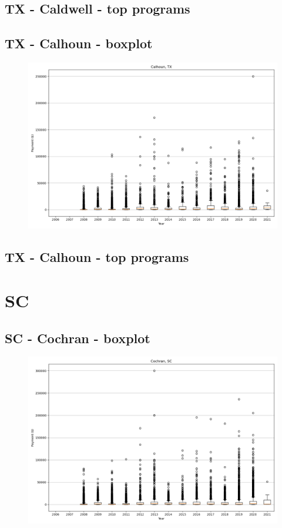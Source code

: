 \subsection*{TX - Caldwell - top programs}

\newpage
\subsection*{TX - Calhoun - boxplot}
\begin{figure}[h]
\centering
\includegraphics[width=7in]{../output/boxplots/counties/Calhoun-TX_boxplot.png}
\end{figure}


\subsection*{TX - Calhoun - top programs}

\newpage
\section*{SC}
\subsection*{SC - Cochran - boxplot}
\begin{figure}[h]
\centering
\includegraphics[width=7in]{../output/boxplots/counties/Cochran-SC_boxplot.png}
\end{figure}


